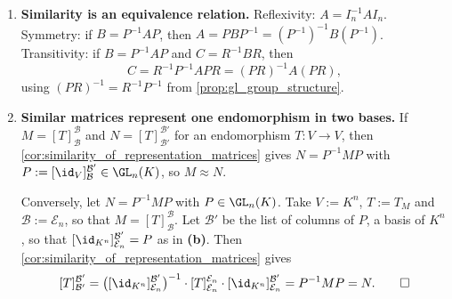 \begin{exercisesolution}
\begin{enumerate}[label=\textbf{(\alph*)}]
    \item \textbf{Similarity is an equivalence relation.} Reflexivity: $A = I_n^{-1} A I_n$. Symmetry: if $B = P^{-1}AP$, then $A = P B P^{-1} = (P^{-1})^{-1} B (P^{-1})$. Transitivity: if $B = P^{-1}AP$ and $C = R^{-1}BR$, then
    \[
    C = R^{-1} P^{-1} A P R = (PR)^{-1} A (PR),
    \]
    using $(PR)^{-1} = R^{-1}P^{-1}$ from \cref{prop:gl_group_structure}.

    \item \textbf{Similar matrices represent one endomorphism in two bases.} If $M = [T]_{\mathcal{B}}^{\mathcal{B}}$ and $N = [T]_{\mathcal{B}'}^{\mathcal{B}'}$ for an endomorphism $T: V \to V$, then \cref{cor:similarity_of_representation_matrices} gives $N = P^{-1} M P$ with $P := [\id_V]_{\mathcal{B}}^{\mathcal{B}'} \in \GL_n(K)$, so $M \approx N$.

    Conversely, let $N = P^{-1} M P$ with $P \in \GL_n(K)$. Take $V := K^n$, $T := T_M$ and $\mathcal{B} := \mathcal{E}_n$, so that $M = [T]_{\mathcal{B}}^{\mathcal{B}}$. Let $\mathcal{B}'$ be the list of columns of $P$, a basis of $K^n$, so that $[\id_{K^n}]_{\mathcal{E}_n}^{\mathcal{B}'} = P$ as in \textbf{(b)}. Then \cref{cor:similarity_of_representation_matrices} gives
    \[
    [T]_{\mathcal{B}'}^{\mathcal{B}'} = \big([\id_{K^n}]_{\mathcal{E}_n}^{\mathcal{B}'}\big)^{-1} \cdot [T]_{\mathcal{E}_n}^{\mathcal{E}_n} \cdot [\id_{K^n}]_{\mathcal{E}_n}^{\mathcal{B}'} = P^{-1} M P = N. \qedhere
    \]
\end{enumerate}
\end{exercisesolution}



